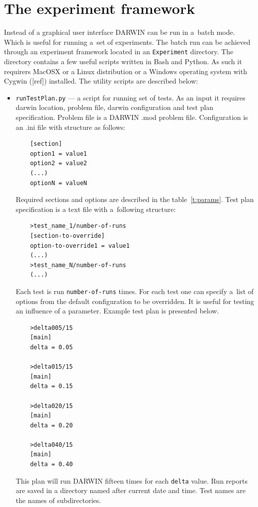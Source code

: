 \section*{The experiment framework} 

Instead of a graphical user interface DARWIN can be run in a~batch mode. Which
is useful for running a~set of experiments. The batch run can be achieved
through an experiment framework located in an \texttt{Experiment}
directory. The directory contains a few useful scripts written in Bash and
Python. As such it requirers MacOSX or a Linux distribution or a Windows
operating system with Cygwin ([ref]) installed. The utility scripts are
described below:

\begin{itemize}
\item \texttt{runTestPlan.py} --- a script for running set of tests. As an
  input it requires darwin location, problem file, darwin configuration and
  test plan specification. Problem file is a DARWIN .mod problem
  file. Configuration is an .ini file with structure as follows:
  \begin{lstlisting}
    [section]
    option1 = value1
    option2 = value2
    (...)
    optionN = valueN
  \end{lstlisting}

  
  Required sections and options are described in the
  table~\ref{t:params}. Test plan specification is a text file with
  a~following structure:
  \begin{lstlisting}
    >test_name_1/number-of-runs
    [section-to-override]
    option-to-override1 = value1
    (...)
    >test_name_N/number-of-runs
    (...)
  \end{lstlisting}

  Each test is run \texttt{number-of-runs} times. For each test one can
  specify a~list of options from the default configuration to be
  overridden. It is useful for testing an influence of a parameter. Example
  test plan is presented below.
  \begin{lstlisting}
    >delta005/15
    [main]
    delta = 0.05

    >delta015/15
    [main]
    delta = 0.15

    >delta020/15
    [main]
    delta = 0.20

    >delta040/15
    [main]
    delta = 0.40
  \end{lstlisting}

  This plan will run DARWIN fifteen times for each \texttt{delta} value. Run
  reports are saved in a directory named after current date and time. Test
  names are the names of subdirectories.


\end{itemize}
